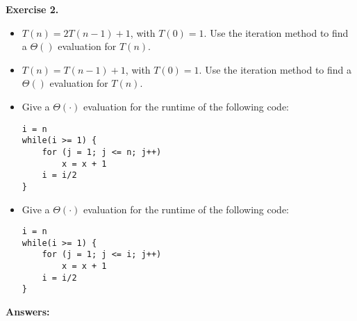 \documentclass[11pt]{article}
\begin{document}
\textbf{Exercise 2.}
\begin{itemize}
    \item \(T(n) = 2T(n-1) + 1\), with \(T(0)=1\). Use the iteration method to find a \(\Theta()\) evaluation for \(T(n)\).
    \item \(T(n) = T(n-1) + 1\), with \(T(0)=1\). Use the iteration method to find a \(\Theta()\) evaluation for \(T(n)\).
    \item Give a \(\Theta(\cdot)\) evaluation for the runtime of the following code:
    \begin{verbatim}
i = n
while(i >= 1) {
    for (j = 1; j <= n; j++)
        x = x + 1
    i = i/2
}
    \end{verbatim}
    \item Give a \(\Theta(\cdot)\) evaluation for the runtime of the following code:
    \begin{verbatim}
i = n
while(i >= 1) {
    for (j = 1; j <= i; j++)
        x = x + 1
    i = i/2
}
    \end{verbatim}
\end{itemize}

\newpage
\textbf{Answers:}
\end{document}

